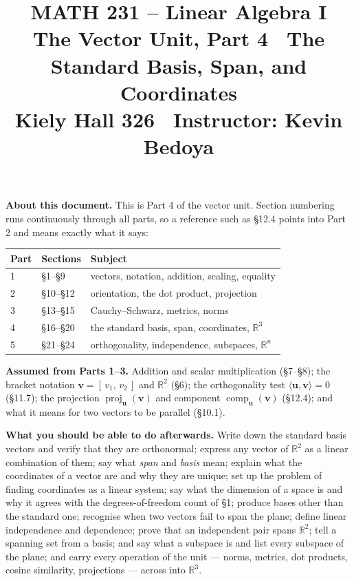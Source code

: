 \documentclass[11pt]{article}
\title{\vspace{-1.2cm}\textbf{\sffamily MATH 231 -- Linear Algebra I}\\[4pt]
       {\large\sffamily The Vector Unit, Part 4 \textbullet\ The Standard
        Basis, Span, and Coordinates}\\[2pt]
       {\normalsize\sffamily Kiely Hall 326 \textbullet\
        Instructor: Kevin Bedoya}}
\author{}
\date{}
\theoremstyle{definition}
\theoremstyle{remark}
\newcommand{\R}{\mathbb{R}}
\newcommand{\vc}[1]{\mathbf{#1}}
\newcommand{\proj}[2]{\operatorname{proj}_{#1}(#2)}
\newcommand{\comp}[2]{\operatorname{comp}_{#1}(#2)}
\begin{document}
\setcounter{section}{15}  %
\maketitle
\vspace{-1.6cm}

\noindent\textbf{About this document.} This is Part 4 of the vector unit.
Section numbering runs continuously through all parts, so a reference such as
\S12.4 points into Part 2 and means exactly what it says:

\begin{center}
\renewcommand{\arraystretch}{1.2}
\begin{tabular}{@{}l l l@{}}
\toprule
\textbf{Part} & \textbf{Sections} & \textbf{Subject} \\
\midrule
1 & \S1--\S9    & vectors, notation, addition, scaling, equality \\
2 & \S10--\S12  & orientation, the dot product, projection \\
3 & \S13--\S15  & Cauchy--Schwarz, metrics, norms \\
4 & \S16--\S20  & the standard basis, span, coordinates, $\R^{3}$ \\
5 & \S21--\S24  & orthogonality, independence, subspaces, $\R^{n}$ \\
\bottomrule
\end{tabular}
\end{center}

\noindent\textbf{Assumed from Parts 1--3.} Addition and scalar multiplication
(\S7--\S8); the bracket notation $\vc{v}=[\,v_1,\,v_2\,]$ and $\R^{2}$ (\S6);
the orthogonality test $\langle\vc{u},\vc{v}\rangle=0$ (\S11.7); the projection
$\proj{\vc{u}}{\vc{v}}$ and component $\comp{\vc{u}}{\vc{v}}$ (\S12.4); and
what it means for two vectors to be parallel (\S10.1).

\medskip
\noindent\textbf{What you should be able to do afterwards.} Write down the
standard basis vectors and verify that they are orthonormal; express any vector
of $\R^{2}$ as a linear combination of them; say what \emph{span} and
\emph{basis} mean; explain what the coordinates of a vector are and why they are
unique; set up the problem of finding coordinates as a linear system; say what
the dimension of a space is and why it agrees with the degrees-of-freedom count
of \S1; produce bases other than the standard one; recognise when two vectors
fail to span the plane; define linear independence and dependence; prove that an
independent pair spans $\R^{2}$; tell a spanning set from a basis; and say what
a subspace is and list every subspace of the plane; and carry every operation of
the unit --- norms, metrics, dot products, cosine similarity, projections ---
across into $\R^{3}$.
\end{document}
